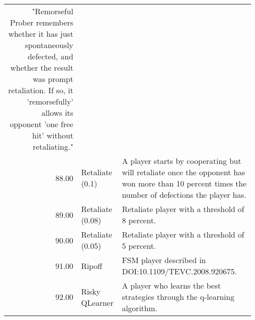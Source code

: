 \begin{table}[!hbtp]
\begin{adjustbox}{width=2\textwidth, angle=90}
\begin{tabular}{rll}
	"Remorseful Prober remembers whether it has just spontaneously defected, and
	whether the result was prompt retaliation. If so, it 'remorsefully' allows
	its opponent 'one free hit' without retaliating."                                                                                                                                                                                                                                                \\
	88.00  & Retaliate (0.1)             & A player starts by cooperating but will retaliate once the opponent
	has won more than 10 percent times the number of defections the player has.                                                                                                                                                                                                                                                                                                                                                                                                                                                                                                                                                                                                                                                                                                                                                                                                                                                                      \\
	89.00  & Retaliate (0.08)            & Retaliate player with a threshold of 8 percent.                                                                                   \\
	90.00  & Retaliate (0.05)            & Retaliate player with a threshold of 5 percent.                                                                                   \\
	91.00  & Ripoff                      & FSM player described in DOI:10.1109/TEVC.2008.920675.                                                                             \\
	92.00  & Risky QLearner              & A player who learns the best strategies through the q-learning algorithm.


\end{tabular}
\end{adjustbox}
\end{table}
